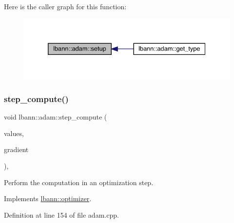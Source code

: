 Here is the caller graph for this function\+:\nopagebreak
\begin{figure}[H]
\begin{center}
\leavevmode
\includegraphics[width=332pt]{classlbann_1_1adam_aea0b1fa44197fe184a6feca5ec5c808e_icgraph}
\end{center}
\end{figure}
\mbox{\label{classlbann_1_1adam_a3bcd1bcbbed2b99c407eb0cd9fd6d449}} 
\subsubsection{\texorpdfstring{step\+\_\+compute()}{step\_compute()}}
{\footnotesize\ttfamily void lbann\+::adam\+::step\+\_\+compute (\begin{DoxyParamCaption}\item[{\hyperlink{base_8hpp_a9a697a504ae84010e7439ffec862b470}{Abs\+Dist\+Mat} \&}]{values,  }\item[{const \hyperlink{base_8hpp_a9a697a504ae84010e7439ffec862b470}{Abs\+Dist\+Mat} \&}]{gradient }\end{DoxyParamCaption})\hspace{0.3cm}{\ttfamily [override]}, {\ttfamily [virtual]}}

Perform the computation in an optimization step. 

Implements \hyperlink{classlbann_1_1optimizer_a0db72c298a0bc3405fb0af97d104a036}{lbann\+::optimizer}.



Definition at line 154 of file adam.\+cpp.


